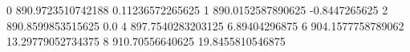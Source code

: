 0 890.9723510742188 0.11236572265625
1 890.0152587890625 -0.8447265625
2 890.8599853515625 0.0
4 897.7540283203125 6.89404296875
6 904.1577758789062 13.29779052734375
8 910.70556640625 19.8455810546875
